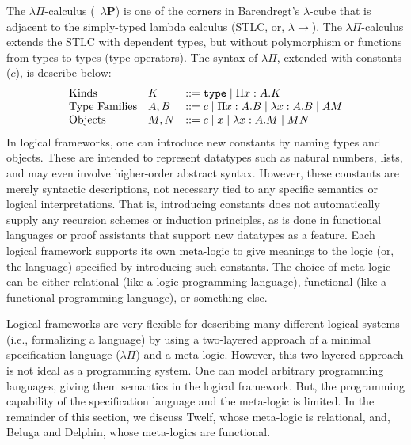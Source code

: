 The $\lambda\Pi$-calculus (\aka\ $\lambda\mathbf{P}$) is one of the corners
in Barendregt's $\lambda$-cube \cite{Barendregt91} that is adjacent to
the simply-typed lambda calculus (STLC, or, $\lambda\!\!\rightarrow$).
The $\lambda\Pi$-calculus extends the STLC with dependent types,
but without polymorphism or functions from types to types (type operators).
The syntax of $\lambda\Pi$, extended with constants ($c$), is describe below:
\[
\begin{array}{lll}
\text{Kinds}         & K   & ::= \texttt{type} \mid \Pi x:A.K
        \\
\text{Type Families} & A,B & ::= c \mid \Pi x:A.B \mid \lambda x:A.B \mid AM
        \\
\text{Objects}       & M,N & ::= c \mid x \mid \lambda x:A.M \mid MN
\end{array}
\]
In logical frameworks, one can introduce new constants by naming types and
objects. These are intended to represent datatypes such as natural numbers,
lists, and may even involve higher-order abstract syntax. However,
these constants are merely syntactic descriptions, not necessary tied to
any specific semantics or logical interpretations. That is, introducing
constants does not automatically supply any recursion schemes or
induction principles, as is done in functional languages or proof assistants
that support new datatypes as a feature. Each logical framework
supports its own meta-logic to give meanings to the logic (or, the language)
specified by introducing such constants. The choice of meta-logic can be either
relational (like a logic programming language),
functional (like a functional programming language), or something else.

Logical frameworks are very flexible for describing many
different logical systems (i.e., formalizing a language) by using
a two-layered approach of a minimal specification language ($\lambda\Pi$)
and a meta-logic. However, this two-layered approach is not ideal
as a programming system. One can model arbitrary
programming languages, giving them semantics
in the logical framework. But, the programming capability of the 
specification language and the meta-logic is limited.
In the remainder of this section, we discuss Twelf, whose meta-logic
is relational, and, Beluga and Delphin, whose meta-logics are functional.

